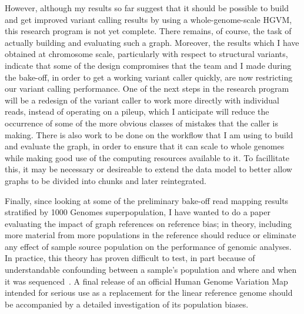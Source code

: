 However, although my results so far suggest that it should be possible to build and get improved variant calling results by using a whole-genome-scale HGVM, this research program is not yet complete. There remains, of course, the task of actually building and evaluating such a graph. Moreover, the results which I have obtained at chromosome scale, particularly with respect to structural variants, indicate that some of the design compromises that the team and I made during the bake-off, in order to get a working \vg variant caller quickly, are now restricting our variant calling performance. One of the next steps in the research program will be a redesign of the variant caller to work more directly with individual reads, instead of operating on a pileup, which I anticipate will reduce the occurrence of some of the more obvious classes of mistakes that the caller is making. There is also work to be done on the workflow that I am using to build and evaluate the graph, in order to ensure that it can scale to whole genomes while making good use of the computing resources available to it. To facillitate this, it may be necessary or desireable to extend the \vg data model to better allow graphs to be divided into chunks and later reintegrated.

Finally, since looking at some of the preliminary bake-off read mapping results stratified by 1000 Genomes superpopulation, I have wanted to do a paper evaluating the impact of graph references on reference bias; in theory, including more material from more populations in the reference should reduce or eliminate any effect of sample source population on the performance of genomic analyses. In practice, this theory has proven difficult to test, in part because of understandable confounding between a sample's population and where and when it was sequenced~\cite{novak2017genome}. A final release of an official Human Genome Variation Map intended for serious use as a replacement for the linear reference genome should be accompanied by a detailed investigation of its population biases.
    

